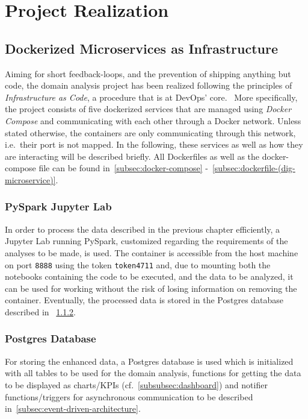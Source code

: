 \section{Project Realization}\label{sec:project-realization}

\subsection{Dockerized Microservices as Infrastructure}\label{subsec:dockerized-microservices-as-infrastructure}

Aiming for short feedback-loops, and the prevention of shipping anything but code, the domain analysis project has been realized following the principles of \textit{Infrastructure as Code}, a procedure that is at DevOps' core.~\autocite[cf.][p. 13]{Riti.2018}
More specifically, the project consists of five dockerized services that are
managed using \textit{Docker Compose} and communicating with each other through a Docker network.
Unless stated otherwise, the containers are only communicating through this network, i.e.\ their port is not mapped.
In the following, these services as well as how they are interacting will be described briefly.
All Dockerfiles as well as the docker-compose file can be found in~\ref{subsec:docker-compose} -~\ref{subsec:dockerfile-(dig-microservice)}.

\subsubsection{PySpark Jupyter Lab}\label{subsubsec:pyspark-jupyter-lab}

In order to process the data described in the previous chapter efficiently, a Jupyter Lab running PySpark, customized regarding the requirements of the analyses to be made, is used.
The container is accessible from the host machine on port \texttt{8888} using the token \texttt{token4711} and, due to mounting both the notebooks containing the code to be executed,
and the data to be analyzed, it can be used for working without the risk of losing information on removing the container.
Eventually, the processed data is stored in the Postgres database described in ~\ref{subsubsec:postgres-database}.
%

\subsubsection{Postgres Database}\label{subsubsec:postgres-database}

For storing the enhanced data, a Postgres database is used which is initialized with all tables to be used for the domain analysis, functions for getting the data to be displayed as charts/KPIs (cf.~\ref{subsubsec:dashboard})
and notifier functions/triggers for asynchronous communication to be described in~\ref{subsec:event-driven-architecture}.

